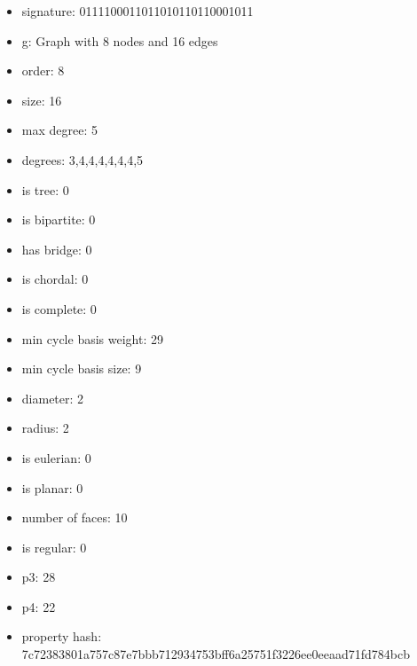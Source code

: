 \begin{itemize}
\item signature: 0111100011011010110110001011
\item g: Graph with 8 nodes and 16 edges
\item order: 8
\item size: 16
\item max degree: 5
\item degrees: 3,4,4,4,4,4,4,5
\item is tree: 0
\item is bipartite: 0
\item has bridge: 0
\item is chordal: 0
\item is complete: 0
\item min cycle basis weight: 29
\item min cycle basis size: 9
\item diameter: 2
\item radius: 2
\item is eulerian: 0
\item is planar: 0
\item number of faces: 10
\item is regular: 0
\item p3: 28
\item p4: 22
\item property hash: 7c72383801a757c87e7bbb712934753bff6a25751f3226ee0eeaad71fd784bcb
\end{itemize}
\newpage
\begin{figure}
\end{figure}
